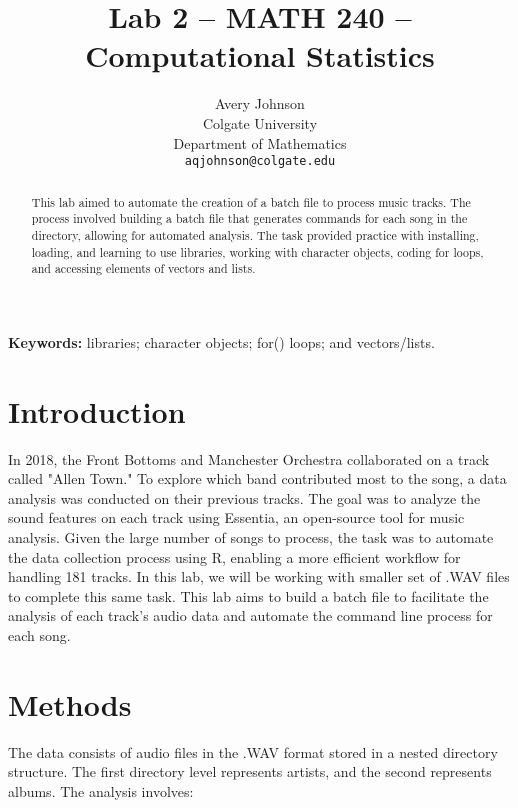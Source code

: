\documentclass{article}\usepackage[]{graphicx}\usepackage[]{xcolor}
\begin{document}
\vspace{-1in}
\title{Lab 2 -- MATH 240 -- Computational Statistics}

\author{
  Avery Johnson \\
  Colgate University  \\
  Department of Mathematics  \\
  {\tt aqjohnson@colgate.edu}
}

\date{}

\maketitle

\begin{multicols}{2}
\begin{abstract}
This lab aimed to automate the creation of a batch file to process music tracks. The process involved building a batch file that generates commands for each song in the directory, allowing for automated analysis. The task provided practice with installing, loading, and learning to use libraries, working with character objects, coding for loops, and accessing elements of vectors and lists. 

\end{abstract}

\noindent \textbf{Keywords:} libraries; character objects; for() loops; and vectors/lists.

\section{Introduction}

In 2018, the Front Bottoms and Manchester Orchestra collaborated on a track called "Allen Town." To explore which band contributed most to the song, a data analysis was conducted on their previous tracks. The goal was to analyze the sound features on each track using Essentia, an open-source tool for music analysis. Given the large number of songs to process, the task was to automate the data collection process using R, enabling a more efficient workflow for handling 181 tracks. In this lab, we will be working with smaller set of .WAV files to complete this same task. This lab aims to build a batch file to facilitate the analysis of each track's audio data and automate the command line process for each song. 

\section{Methods}
The data consists of audio files in the .WAV format stored in a nested directory structure. The first directory level represents artists, and the second represents albums. The analysis involves: 
\columnbreak

\end{multicols}
\end{document}
